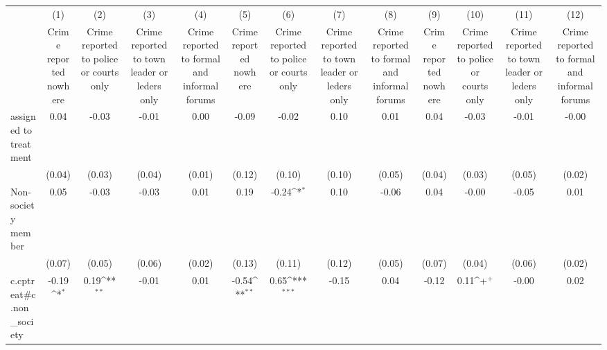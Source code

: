 {
\def\sym#1{\ifmmode^{#1}\else\(^{#1}\)\fi}
\begin{tabular}{l*{12}{c}}
\hline\hline
                    &\multicolumn{1}{c}{(1)}&\multicolumn{1}{c}{(2)}&\multicolumn{1}{c}{(3)}&\multicolumn{1}{c}{(4)}&\multicolumn{1}{c}{(5)}&\multicolumn{1}{c}{(6)}&\multicolumn{1}{c}{(7)}&\multicolumn{1}{c}{(8)}&\multicolumn{1}{c}{(9)}&\multicolumn{1}{c}{(10)}&\multicolumn{1}{c}{(11)}&\multicolumn{1}{c}{(12)}\\
                    &\multicolumn{1}{c}{Crime reported nowhere}&\multicolumn{1}{c}{Crime reported to police or courts only}&\multicolumn{1}{c}{Crime reported to town leader or leders only}&\multicolumn{1}{c}{Crime reported to formal and informal forums}&\multicolumn{1}{c}{Crime reported nowhere}&\multicolumn{1}{c}{Crime reported to police or courts only}&\multicolumn{1}{c}{Crime reported to town leader or leders only}&\multicolumn{1}{c}{Crime reported to formal and informal forums}&\multicolumn{1}{c}{Crime reported nowhere}&\multicolumn{1}{c}{Crime reported to police or courts only}&\multicolumn{1}{c}{Crime reported to town leader or leders only}&\multicolumn{1}{c}{Crime reported to formal and informal forums}\\
\hline
assigned to treatment&        0.04         &       -0.03         &       -0.01         &        0.00         &       -0.09         &       -0.02         &        0.10         &        0.01         &        0.04         &       -0.03         &       -0.01         &       -0.00         \\
                    &      (0.04)         &      (0.03)         &      (0.04)         &      (0.01)         &      (0.12)         &      (0.10)         &      (0.10)         &      (0.05)         &      (0.04)         &      (0.03)         &      (0.05)         &      (0.02)         \\
[1em]
Non-society member  &        0.05         &       -0.03         &       -0.03         &        0.01         &        0.19         &       -0.24\sym{*}  &        0.10         &       -0.06         &        0.04         &       -0.00         &       -0.05         &        0.01         \\
                    &      (0.07)         &      (0.05)         &      (0.06)         &      (0.02)         &      (0.13)         &      (0.11)         &      (0.12)         &      (0.05)         &      (0.07)         &      (0.04)         &      (0.06)         &      (0.02)         \\
[1em]
c.cptreat#c.non\_society&       -0.19\sym{*}  &        0.19\sym{**} &       -0.01         &        0.01         &       -0.54\sym{**} &        0.65\sym{***}&       -0.15         &        0.04         &       -0.12         &        0.11\sym{+}  &       -0.00         &        0.02         \\

\end{tabular}}
